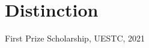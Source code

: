 \documentclass{article}
\begin{document}


















\section*{Distinction}
\indent


First Prize Scholarship, UESTC, 2021

\end{document}
